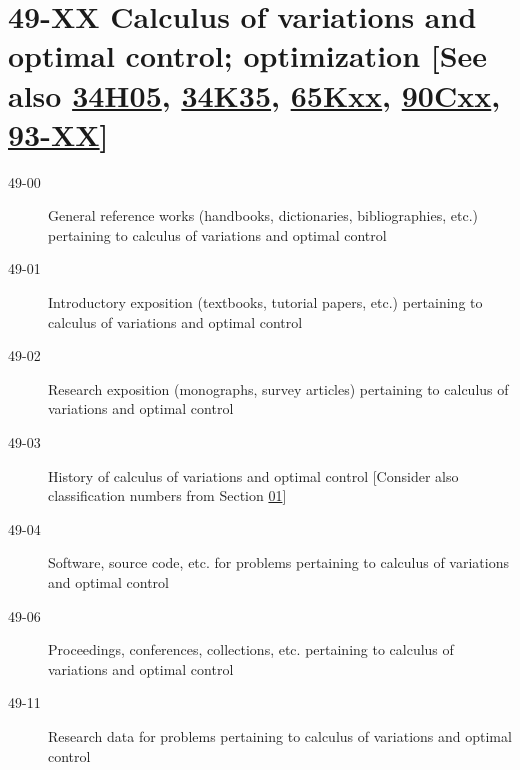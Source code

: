 \documentclass[letterpaper]{article}
\begin{document}
\section*{49-XX Calculus of variations and optimal control; optimization [See also \hyperref[34H05]{34H05}, \hyperref[34K35]{34K35}, \hyperref[65Kxx]{65Kxx}, \hyperref[90Cxx]{90Cxx}, \hyperref[93-XX]{93-XX}] }\label{49-XX}
\begin{description}
\item [49-00]\label{49-00} General reference works (handbooks, dictionaries, bibliographies, etc.) pertaining to calculus of variations and optimal control
\item [49-01]\label{49-01} Introductory exposition (textbooks, tutorial papers, etc.) pertaining to calculus of variations and optimal control
\item [49-02]\label{49-02} Research exposition (monographs, survey articles) pertaining to calculus of variations and optimal control
\item [49-03]\label{49-03} History of calculus of variations and optimal control [Consider also classification numbers from Section \hyperref[01-XX]{01}]
\item [49-04]\label{49-04} Software, source code, etc. for problems pertaining to calculus of variations and optimal control
\item [49-06]\label{49-06} Proceedings, conferences, collections, etc. pertaining to calculus of variations and optimal control
\item [49-11]\label{49-11} Research data for problems pertaining to calculus of variations and optimal control
\end{description}
\end{document}

